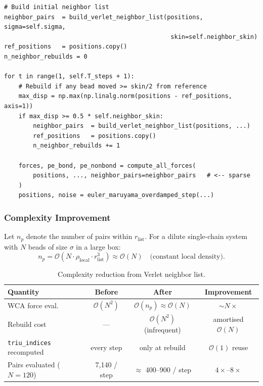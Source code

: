 \documentclass[12pt,a4paper]{article}
\newcommand{\Obig}[1]{\mathcal{O}\!\left(#1\right)}
\newcommand{\code}[1]{\texttt{#1}}
\begin{document}
\begin{lstlisting}[caption={Modified \code{NumpySimulator.run()} main loop — Verlet integration.},
                   label={lst:sim-vlist}]
# Build initial neighbor list
neighbor_pairs  = build_verlet_neighbor_list(positions, sigma=self.sigma,
                                              skin=self.neighbor_skin)
ref_positions   = positions.copy()
n_neighbor_rebuilds = 0

for t in range(1, self.T_steps + 1):
    # Rebuild if any bead moved >= skin/2 from reference
    max_disp = np.max(np.linalg.norm(positions - ref_positions, axis=1))
    if max_disp >= 0.5 * self.neighbor_skin:
        neighbor_pairs  = build_verlet_neighbor_list(positions, ...)
        ref_positions   = positions.copy()
        n_neighbor_rebuilds += 1

    forces, pe_bond, pe_nonbond = compute_all_forces(
        positions, ..., neighbor_pairs=neighbor_pairs   # <-- sparse
    )
    positions, noise = euler_maruyama_overdamped_step(...)
\end{lstlisting}

\subsubsection{Complexity Improvement}

Let $n_p$ denote the number of pairs within $r_\text{list}$. For a dilute
single-chain system with $N$ beads of size $\sigma$ in a large box:
\[
  n_p = \Obig{N \cdot \rho_\text{local} \cdot r_\text{list}^3}
      \approx \Obig{N} \quad \text{(constant local density)}.
\]

\begin{table}[h]
\centering
\caption{Complexity reduction from Verlet neighbor list.}
\label{tab:verlet}
\begin{tabular}{lccc}
\toprule
Quantity & Before & After & Improvement \\
\midrule
WCA force eval.    & $\Obig{N^2}$ & $\Obig{n_p} \approx \Obig{N}$ & $\sim N\times$ \\
Rebuild cost       & --- & $\Obig{N^2}$ (infrequent) & amortised $\Obig{N}$ \\
\code{triu\_indices} recomputed & every step & only at rebuild & $\Obig{1}$ reuse \\
Pairs evaluated ($N=120$) & 7,140 / step & $\approx$ 400--900 / step & $4\times$--$8\times$ \\
\bottomrule
\end{tabular}
\end{table}
\end{document}

